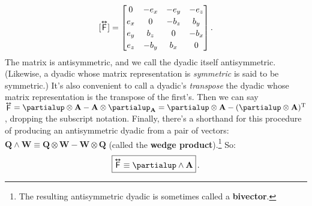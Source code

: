 \documentclass[12pt]{article}
\renewcommand{\vv}[1]{\mathbf{#1}}
\newcommand{\tightoverset}[2]{%
  \mathop{#2}\limits^{\vbox to -.5ex{\kern-0.75ex\hbox{$#1$}\vss}}}
\newcommand{\inlinedy}[1]{\tightoverset{\text{\tiny$\bm\leftrightarrow$}}{#1}}
\newcommand{\capdy}[1]{ \overset{ \text{\tiny$\bm\leftrightarrow$} }{\vphantom{\text{\small{A}}}\smash{#1}} }
\begin{document}
\begin{equation}\label{eq:emt}
[\capdy{\mathsf{F}}]
=
\begin{bmatrix}
0 & -e_x & -e_y & -e_z \\[.5ex]
e_x & 0 & -b_z & b_y \\[.5ex]
e_y & b_z & 0 & -b_x \\[.5ex]
e_z & -b_y & b_x & 0
\end{bmatrix} .
\end{equation}
The matrix is antisymmetric, and we call the dyadic itself antisymmetric. (Likewise, a dyadic whose matrix representation is \emph{symmetric} is said to be symmetric.) It's also convenient to call a dyadic's \emph{transpose} the dyadic whose matrix representation is the transpose of the first's. Then we can say ${\inlinedy{\mathsf{F}} = \partialup \otimes \vv A - \vv A \otimes \partialup_{\vv A} = \partialup \otimes \vv A - (\partialup \otimes \vv A)^\mathrm{T}}$, dropping the subscript notation. Finally, there's a shorthand for this procedure of producing an antisymmetric dyadic from a pair of vectors: $\vv Q \wedge \vv W \equiv \vv Q \otimes \vv W - \vv W \otimes \vv Q$ (called the \textbf{wedge product}).\footnote{The resulting antisymmetric dyadic is sometimes called a \textbf{bivector}.} So:
\begin{equation}\label{eq:emta}
\boxed{ \vphantom{A_{A_A}} \capdy{\mathsf{F}} \equiv \partialup \wedge \vv A } \, . 
\end{equation}
\end{document}
